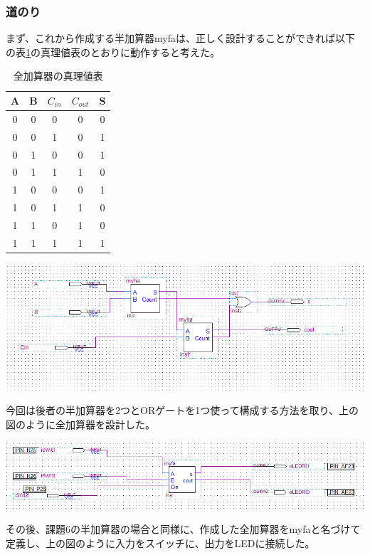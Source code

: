 \documentclass[a4paper]{jarticle}
\begin{document}
\subsubsection{道のり}
まず、これから作成する半加算器myfaは、正しく設計することができれば以下の表\ref{Report7myfa}の真理値表のとおりに動作すると考えた。
\begin{table}[ht]
	\begin{center}
		\caption{全加算器の真理値表}
		\label{Report7myfa}
		\begin{tabular}{|c|c|c|c|c|}					\hline
			A	&B	&$C_{in}$	&$C_{out}$	&S\\	\hline\hline
			0	&0	&0		&0		&0\\	\hline
			0	&0	&1		&0		&1\\	\hline
			0	&1	&0		&0		&1\\	\hline
			0	&1	&1		&1		&0\\	\hline
			1	&0	&0		&0		&1\\	\hline
			1	&0	&1		&1		&0\\	\hline
			1	&1	&0		&1		&0\\	\hline
			1	&1	&1		&1		&1\\	\hline
		\end{tabular}
	\end{center}
\end{table}
\begin{center}
	\includegraphics[width=15cm]{work7myfa.PNG}
\end{center}
今回は後者の半加算器を2つとORゲートを1つ使って構成する方法を取り、上の図のように全加算器を設計した。
\begin{center}
	\includegraphics[width=15cm]{work7main.PNG}
\end{center}
その後、課題6の半加算器の場合と同様に、作成した全加算器をmyfaと名づけて定義し、上の図のように入力をスイッチに、出力をLEDに接続した。
\end{document}
